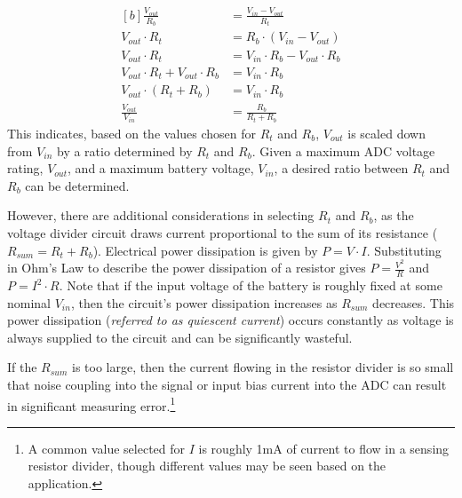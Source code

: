 \documentclass[main.tex]{subfiles}
\begin{document}
\begin{equation}
    \begin{aligned}[b]
        \frac{V_{out}}{R_b} &= \frac{V_{in} - V_{out}}{R_t} \\
        V_{out} \cdot R_t &= R_b \cdot (V_{in} - V_{out}) \\
        V_{out} \cdot R_t &= V_{in} \cdot R_b - V_{out} \cdot R_b \\
        V_{out} \cdot R_t + V_{out} \cdot R_b &= V_{in} \cdot R_b \\
        V_{out} \cdot (R_t + R_b) &= V_{in} \cdot R_b \\
        \frac{V_{out}}{V_{in}} &= \frac{R_b}{R_t + R_b}
    \end{aligned}
    \label{eq:voltage_divider}
\end{equation}
This indicates, based on the values chosen for $R_t$ and $R_b$, $V_{out}$ is scaled down from $V_{in}$ by a ratio determined by $R_t$ and $R_b$. Given a maximum ADC voltage rating, $V_{out}$, and a maximum battery voltage, $V_{in}$, a desired ratio between $R_t$ and $R_b$ can be determined. \newline

\newnoindentpara However, there are additional considerations in selecting $R_t$ and $R_b$, as the voltage divider circuit draws current proportional to the sum of its resistance ($R_{sum} = R_{t} + R_{b}$). Electrical power dissipation is given by $P = V \cdot I$. Substituting in Ohm's Law to describe the power dissipation of a resistor gives $P = \frac{V^2}{R}$ and $P = I^{2} \cdot R$. Note that if the input voltage of the battery is roughly fixed at some nominal $V_{in}$, then the circuit's power dissipation increases as $R_{sum}$ decreases. This power dissipation (\textit{referred to as quiescent current}) occurs constantly as voltage is always supplied to the circuit and can be significantly wasteful. \newline

\newnoindentpara If the $R_{sum}$ is too large, then the current flowing in the resistor divider is so small that noise coupling into the signal or input bias current into the ADC can result in significant measuring error.\footnote{A common value selected for $I$ is roughly 1mA of current to flow in a sensing resistor divider, though different values may be seen based on the application.}
\end{document}
